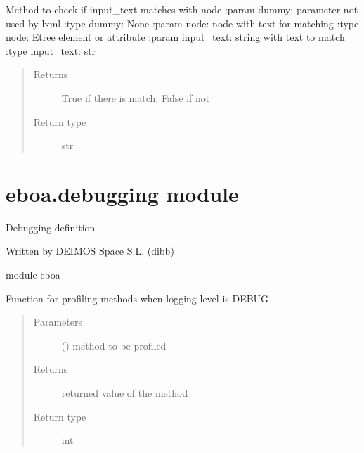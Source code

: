\begin{fulllineitems}
\label{\detokenize{eboa.triggering:eboa.triggering.xpath_functions.match}}
Method to check if input\_text matches with node
:param dummy: parameter not used by lxml
:type dummy: None
:param node: node with text for matching
:type node: Etree element or attribute
:param input\_text: string with text to match
:type input\_text: str
\begin{quote}\begin{description}
\item[{Returns}] \leavevmode
True if there is match, False if not

\item[{Return type}] \leavevmode
str

\end{description}\end{quote}

\end{fulllineitems}



\section{eboa.debugging module}
\label{\detokenize{eboa:module-eboa.debugging}}\label{\detokenize{eboa:eboa-debugging-module}}
Debugging definition

Written by DEIMOS Space S.L. (dibb)

module eboa

\begin{fulllineitems}
\label{\detokenize{eboa:eboa.debugging.debug}}
Function for profiling methods when logging level is DEBUG
\begin{quote}\begin{description}
\item[{Parameters}] \leavevmode
{} () \textendash{} method to be profiled

\item[{Returns}] \leavevmode
returned value of the method

\item[{Return type}] \leavevmode
int

\end{description}\end{quote}

\end{fulllineitems}

